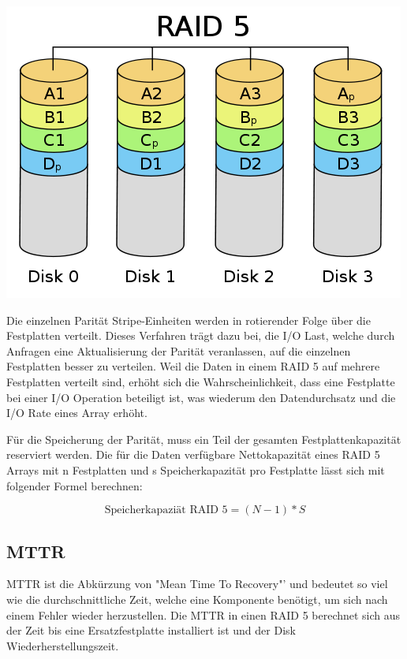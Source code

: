 \begin{center}
\includegraphics[width=\linewidth, keepaspectratio = true]{media/Raid-5.png}
\end{center}

Die einzelnen Parität Stripe-Einheiten werden in rotierender Folge über die Festplatten verteilt. Dieses Verfahren trägt dazu bei, die I/O Last, welche durch Anfragen eine Aktualisierung der Parität veranlassen, auf die einzelnen Festplatten besser zu verteilen. Weil die Daten in einem RAID 5 auf mehrere Festplatten verteilt sind, erhöht sich die Wahrscheinlichkeit, dass eine Festplatte bei einer I/O Operation beteiligt ist, was wiederum den Datendurchsatz und die I/O Rate eines Array erhöht. \cite{Kuratti1995}

Für die Speicherung der Parität, muss ein Teil der gesamten Festplattenkapazität reserviert werden. Die für die Daten verfügbare Nettokapazität eines RAID 5 Arrays mit n Festplatten und s Speicherkapazität pro Festplatte lässt sich mit folgender Formel \cite{Kuratti1995} berechnen:

\begin{equation}
\mbox{Speicherkapaziät RAID 5}=(N-1)*S
\label{eqn:MTBF-RAID 5}
\end{equation}
 

\subsection{MTTR}
MTTR  ist die Abkürzung von "Mean Time To Recovery"' und bedeutet so viel wie die durchschnittliche Zeit, welche eine Komponente benötigt, um sich nach einem Fehler wieder herzustellen. Die MTTR in einen RAID 5 berechnet sich aus der Zeit bis eine Ersatzfestplatte installiert ist und der Disk Wiederherstellungszeit. 

